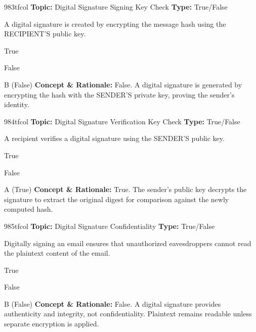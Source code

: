 \begin{qcard}{983}{tfcol}
\textcolor{darkslate!75}{\small\textbf{Topic:} Digital Signature Signing Key Check \hfill \textbf{Type:} True/False}\vspace{0.4em}\par
A digital signature is created by encrypting the message hash using the RECIPIENT'S public key.
\begin{qoptions}
\item True
\item False
\end{qoptions}
\end{qcard}
\nopagebreak
\begin{explainbox}{B (False)}
\textbf{Concept \& Rationale:} False. A digital signature is generated by encrypting the hash with the SENDER'S private key, proving the sender's identity.
\end{explainbox}

\begin{qcard}{984}{tfcol}
\textcolor{darkslate!75}{\small\textbf{Topic:} Digital Signature Verification Key Check \hfill \textbf{Type:} True/False}\vspace{0.4em}\par
A recipient verifies a digital signature using the SENDER'S public key.
\begin{qoptions}
\item True
\item False
\end{qoptions}
\end{qcard}
\nopagebreak
\begin{explainbox}{A (True)}
\textbf{Concept \& Rationale:} True. The sender's public key decrypts the signature to extract the original digest for comparison against the newly computed hash.
\end{explainbox}

\begin{qcard}{985}{tfcol}
\textcolor{darkslate!75}{\small\textbf{Topic:} Digital Signature Confidentiality \hfill \textbf{Type:} True/False}\vspace{0.4em}\par
Digitally signing an email ensures that unauthorized eavesdroppers cannot read the plaintext content of the email.
\begin{qoptions}
\item True
\item False
\end{qoptions}
\end{qcard}
\nopagebreak
\begin{explainbox}{B (False)}
\textbf{Concept \& Rationale:} False. A digital signature provides authenticity and integrity, not confidentiality. Plaintext remains readable unless separate encryption is applied.
\end{explainbox}

